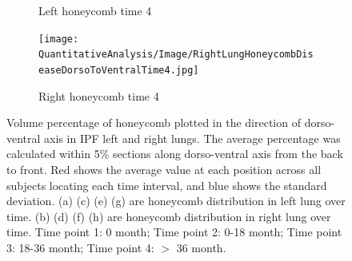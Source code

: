 \begin{figure}[H]
\begin{subfigure}{.41\linewidth}
  \caption{Left honeycomb time 4}
  \label{fig:DiseaseDorsoToVentralOverTime3-g} 
\end{subfigure} 
\begin{subfigure}{.41\linewidth}%
  \texttt{[image: QuantitativeAnalysis/Image/RightLungHoneycombDiseaseDorsoToVentralTime4.jpg]}
  \caption{Right honeycomb time 4}
  \label{fig:DiseaseDorsoToVentralOverTime3-h}
\end{subfigure}
\caption{Volume percentage of honeycomb plotted in the direction of dorso-ventral axis in IPF left and right lungs. The average percentage was calculated within 5\% sections along dorso-ventral axis from the back to front. Red shows the average value at each position across all subjects locating each time interval, and blue shows the standard deviation. (a) (c) (e) (g) are honeycomb distribution in left lung over time. (b) (d) (f) (h) are honeycomb distribution in right lung over time. Time point 1: 0 month; Time point 2: 0-18 month; Time point 3: 18-36 month; Time point 4: $>$ 36 month.}
\label{fig:DiseaseDorsoToVentralOverTime3}
\end{figure}

